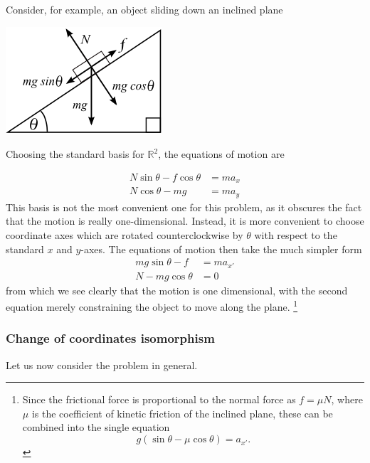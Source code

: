 \documentclass[12pt,letterpaper,reqno]{article}
\numberwithin{equation}{section}
\begin{document}
\begin{example}
	Consider, for example, an object sliding down an inclined plane 

\begin{center}
	\includegraphics[scale=0.5]{figures_mvc/inclined_plane}
\end{center}

Choosing the standard basis for $\mathbb{R}^2$, the equations of motion are

\begin{align}
	N\sin \theta - f \cos \theta &= m a_x \\
	N\cos \theta - mg &= ma_y
\end{align}
This basis is not the most convenient one for this problem, as it obscures the fact that the motion is really one-dimensional. Instead, it is more convenient to choose coordinate axes which are rotated counterclockwise by $\theta$ with respect to the standard $x$ and $y$-axes. The equations of motion then take the much simpler form
\begin{align}
	mg \sin \theta -f &= ma_{x'} \\
	N-mg \cos \theta &=0 
\end{align}
from which we see clearly that the motion is one dimensional, with the second equation merely constraining the object to move along the plane. \footnote{Since the frictional force is proportional to the normal force as $f=\mu N$, where $\mu$ is the coefficient of kinetic friction of the inclined plane, these can be combined into the single equation
	$$g(\sin \theta-\mu \cos \theta)=a_{x'}.$$}
\end{example}

\subsubsection{Change of coordinates isomorphism}
	Let us now consider the problem in general. 
	
\end{document}
